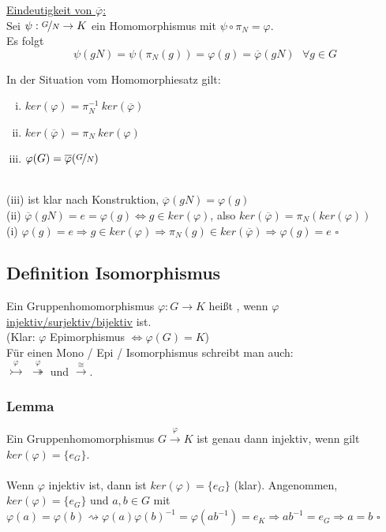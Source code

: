 \uline{Eindeutigkeit von $\overline{\varphi}$:}\\ Sei $\psi: \nicefrac{G}{N} \to K$ ein Homomorphismus mit $\psi \circ \pi_N = \varphi$.\\
Es folgt 
\[
\psi(gN)=\psi(\pi_N(g))=\varphi(g)=\overline{\varphi}(gN) ~~~\forall g \in G
\]

In der Situation vom Homomorphiesatz gilt:
\begin{enumerate}[(i)]
	\item $ker(\varphi)=\pi_N^{-1}~ker(\overline{\varphi})$
	\item $ker(\overline{\varphi})=\pi_N~ker(\varphi)$
	\item $\varphi(G)=\overline{\varphi}(\nicefrac{G}{N})$
\end{enumerate}
\\
(iii) ist klar nach Konstruktion, $\overline{\varphi}(gN)=\varphi(g)$\\
(ii) $\overline{\varphi}(gN)=e=\varphi(g) \Leftrightarrow g \in ker(\varphi)$, also $ker(\overline{\varphi})=\pi_N(ker(\varphi))$\\
(i) $\varphi(g)=e \Rightarrow g \in ker(\varphi) \Rightarrow\pi_N(g) \in ker(\overline{\varphi}) \Rightarrow \varphi(g)=e$
\hfill $\square$


\subsection{Definition Isomorphismus}
\label{sub:def_isomorph}
Ein Gruppenhomomorphismus $\varphi:G \to K$ heißt , wenn $\varphi$ \uline{injektiv/surjektiv/bijektiv} ist.\\
(Klar: $\varphi$ Epimorphismus $\Leftrightarrow \varphi(G)=K$)\\
Für einen Mono / Epi / Isomorphismus schreibt man auch: \\
$\stackrel{\varphi}{\rightarrowtail}$  $\stackrel{\varphi}{\twoheadrightarrow}$  und  $\stackrel{\cong}{\to}$.

\subsubsection*{Lemma}
Ein Gruppenhomomorphismus $G \stackrel{\varphi}{\to}K$ ist genau dann injektiv, wenn gilt $ker(\varphi)=\{e_G\}$.\\

\\
Wenn $\varphi$ injektiv ist, dann ist $ker(\varphi)=\{e_G\}$ (klar). Angenommen, $ker(\varphi)=\{e_G\}$ und $a,b\in G$ mit $\varphi(a)=\varphi(b) \rightsquigarrow \varphi(a)\varphi(b)^{-1}=\varphi(ab^{-1})=e_K \Rightarrow ab^{-1}=e_G \Rightarrow a=b$
\hfill $\square$

